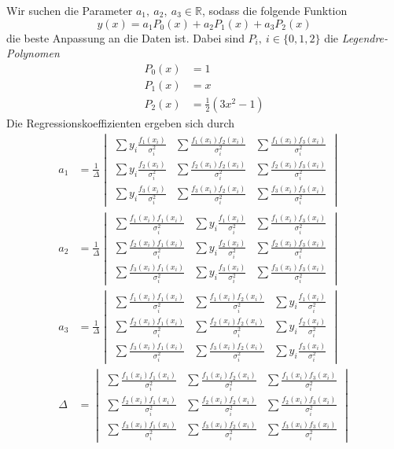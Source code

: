 \documentclass[prb,12pt]{revtex4-2}
\theoremstyle{definition}
\theoremstyle{definition}
\newcommand{\R}{\mathbb{R}}
\begin{document}
Wir suchen die Parameter $a_1,~a_2,~a_3\in \R$, sodass die folgende Funktion
\begin{equation}
	y(x)=a_1 P_0(x)+a_2 P_1(x)+a_3 P_2(x)
\end{equation}
die beste Anpassung an die Daten ist. Dabei sind $P_i,~i\in \{0,1,2\}$ die \emph{Legendre-Polynomen}
\begin{align*}
	P_0(x)&=1\\
	P_1(x)&=x\\
	P_2(x)&=\frac 12 (3x^2-1)
\end{align*}
Die Regressionskoeffizienten ergeben sich durch
\begin{align*}
	a_1&=\frac 1\Delta\begin{vmatrix}
		\sum y_i \frac{f_1(x_i)}{\sigma_i^2} & \sum \frac{f_1(x_i)f_2(x_i)}{\sigma_i^2} & \sum \frac{f_1(x_i)f_3(x_i)}{\sigma_i^2} \\
		\sum y_i \frac{f_2(x_i)}{\sigma_i^2} & \sum \frac{f_2(x_i)f_2(x_i)}{\sigma_i^2} & \sum \frac{f_2(x_i)f_3(x_i)}{\sigma_i^2} \\
		\sum y_i \frac{f_3(x_i)}{\sigma_i^2} & \sum \frac{f_3(x_i)f_2(x_i)}{\sigma_i^2} & \sum \frac{f_3(x_i)f_3(x_i)}{\sigma_i^2}
	\end{vmatrix}\\
	a_2&=\frac 1\Delta\begin{vmatrix}
	\sum \frac{f_1(x_i)f_1(x_i)}{\sigma_i^2} & \sum y_i \frac{f_1(x_i)}{\sigma_i^2} & \sum \frac{f_1(x_i)f_3(x_i)}{\sigma_i^2} \\
	\sum \frac{f_2(x_i)f_1(x_i)}{\sigma_i^2} & \sum y_i \frac{f_2(x_i)}{\sigma_i^2} & \sum \frac{f_2(x_i)f_3(x_i)}{\sigma_i^2} \\
	\sum \frac{f_3(x_i)f_1(x_i)}{\sigma_i^2} & \sum y_i \frac{f_3(x_i)}{\sigma_i^2} & \sum \frac{f_3(x_i)f_3(x_i)}{\sigma_i^2}
\end{vmatrix}\\
	a_3&=\frac 1\Delta\begin{vmatrix}
	\sum \frac{f_1(x_i)f_1(x_i)}{\sigma_i^2} & \sum \frac{f_1(x_i)f_2(x_i)}{\sigma_i^2} &  \sum y_i \frac{f_1(x_i)}{\sigma_i^2} \\
	\sum \frac{f_2(x_i)f_1(x_i)}{\sigma_i^2} & \sum \frac{f_2(x_i)f_2(x_i)}{\sigma_i^2} &  \sum y_i \frac{f_2(x_i)}{\sigma_i^2} \\
	\sum \frac{f_3(x_i)f_1(x_i)}{\sigma_i^2} & \sum \frac{f_3(x_i)f_2(x_i)}{\sigma_i^2} & \sum y_i \frac{f_3(x_i)}{\sigma_i^2}
\end{vmatrix}\\
	\Delta&=\begin{vmatrix}
		\sum \frac{f_1(x_i)f_1(x_i)}{\sigma_i^2} & \sum \frac{f_1(x_i)f_2(x_i)}{\sigma_i^2} & \sum \frac{f_1(x_i)f_3(x_i)}{\sigma_i^2} \\
		\sum \frac{f_2(x_i)f_1(x_i)}{\sigma_i^2} & \sum \frac{f_2(x_i)f_2(x_i)}{\sigma_i^2} & \sum \frac{f_2(x_i)f_3(x_i)}{\sigma_i^2} \\
		\sum \frac{f_3(x_i)f_1(x_i)}{\sigma_i^2} & \sum \frac{f_3(x_i)f_2(x_i)}{\sigma_i^2} & \sum \frac{f_3(x_i)f_3(x_i)}{\sigma_i^2}
	\end{vmatrix}
\end{align*}
\end{document}
